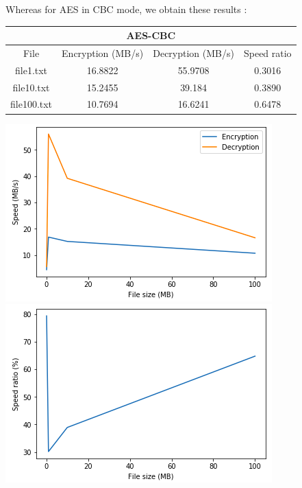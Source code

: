 \documentclass[11pt]{article}
\begin{document}
Whereas for AES in CBC mode, we obtain these results :
\begin{center}
\begin{tabular}{| c | c | c | c |}
\hline
\multicolumn{4}{|c|}{AES-CBC} \\
\hline
File & Encryption (MB/s) & Decryption (MB/s) & Speed ratio\\
\hline
file1.txt & 16.8822 & 55.9708 & 0.3016 \\
\hline
file10.txt & 15.2455 & 39.184 & 0.3890 \\
\hline
file100.txt & 10.7694 & 16.6241 & 0.6478 \\
\hline
\end{tabular}
\end{center}
\begin{center}
\includegraphics[scale=0.45]{./enc_dec_speed_aes_cbc.png}
\includegraphics[scale=0.45]{./avg_speed_ratio_aes_cbc.png}
\end{center}
\end{document}
